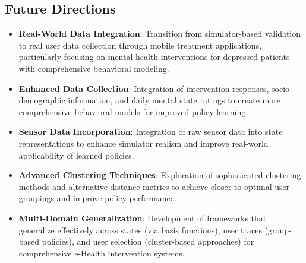 \subsection*{Future Directions}
\begin{itemize}
    \item \textbf{Real-World Data Integration}: Transition from simulator-based validation to real user data collection through mobile treatment applications, particularly focusing on mental health interventions for depressed patients with comprehensive behavioral modeling.
    \item \textbf{Enhanced Data Collection}: Integration of intervention responses, socio-demographic information, and daily mental state ratings to create more comprehensive behavioral models for improved policy learning.
    \item \textbf{Sensor Data Incorporation}: Integration of raw sensor data into state representations to enhance simulator realism and improve real-world applicability of learned policies.
    \item \textbf{Advanced Clustering Techniques}: Exploration of sophisticated clustering methods and alternative distance metrics to achieve closer-to-optimal user groupings and improve policy performance.
    \item \textbf{Multi-Domain Generalization}: Development of frameworks that generalize effectively across states (via basis functions), user traces (group-based policies), and user selection (cluster-based approaches) for comprehensive e-Health intervention systems.
\end{itemize}


